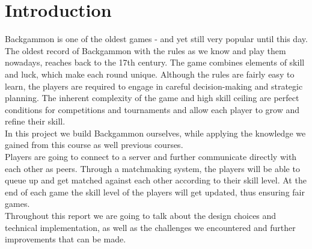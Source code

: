 \documentclass[ twoside,openright,titlepage,numbers=noenddot,headinclude,%
                footinclude=true,cleardoublepage=empty,abstractoff, %
                BCOR=5mm,paper=a4,fontsize=11pt,%
                ngerman,american,%
                ]{scrreprt}
\begin{document}
\frenchspacing
\raggedbottom
{} %
\pagestyle{plain}



\pagestyle{scrheadings}
\cleardoublepage
\cleardoublepage{}
\cleardoublepage


\chapter{Introduction}
\label{cha:introduction}
Backgammon is one of the oldest games - and yet still very popular until this day. The oldest record of Backgammon with the rules as we know and play them nowadays, reaches back to the 17th century. 
The game combines elements of skill and luck, which make each round unique. Although the rules are fairly easy to learn, the players are required to engage in careful decision-making and strategic planning.
The inherent complexity of the game and high skill ceiling are perfect conditions for competitions and tournaments and allow each player to grow and refine their skill. \\
In this project we build Backgammon ourselves, while applying the knowledge we gained from this course as well previous courses. \\
Players are going to connect to a server and further communicate directly with each other as peers. %
Through a matchmaking system, the players will be able to queue up and get matched against each other according to their skill level. 
At the end of each game the skill level of the players will get updated, thus ensuring fair games.\\
Throughout this report we are going to talk about the design choices and technical implementation, as well as the challenges we encountered and further improvements that can be made. 
\end{document}
